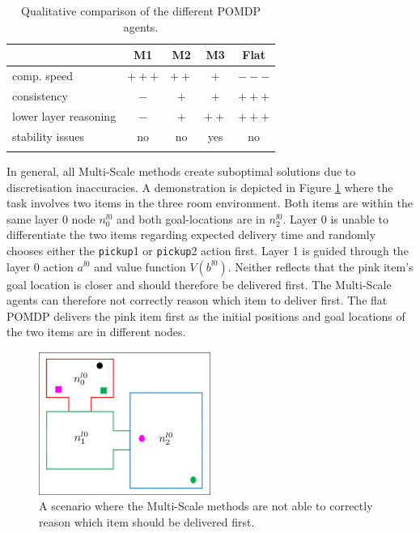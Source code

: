 \begin{table}[h]
    \centering
    \begin{tabular}{l c c c c}
    \toprule
         &  M1 & M2 & M3 & Flat\\
    \midrule
        \addlinespace
         comp. speed & $+++$ & $++$ & $+$ & $---$ \\
         \addlinespace
         consistency & $-$ & $+$ & $+$ & $+++$ \\
         \addlinespace
         lower layer reasoning & $-$ & $+$ & $++$ & $+++$ \\
         \addlinespace
         stability issues & no & no& yes & no\\
         \addlinespace
    \bottomrule
    \end{tabular}
    \caption{Qualitative comparison of the different POMDP agents.}
    \label{tab:properties}
\end{table}
In general, all Multi-Scale methods create suboptimal solutions due to discretisation inaccuracies. A demonstration is depicted in Figure \ref{fig:suboptimal} where the task involves two items in the three room environment. Both items are within the same layer 0 node $n_0^{l0}$ and both goal-locations are in $n_2^{l0}$. Layer 0 is unable to differentiate the two items regarding expected delivery time and randomly chooses either the \texttt{pickup}1 or \texttt{pickup}2 action first. Layer 1 is guided through the layer 0 action $a^{l0}$ and value function $V(b^{l0})$. Neither reflects that the pink item's goal location is closer and should therefore be delivered first. The Multi-Scale agents can therefore not correctly reason which item to deliver first. The flat POMDP delivers the pink item first as the initial positions and goal locations of the two items are in different nodes. 
\begin{figure}[h]
    \centering
    \includegraphics[width=0.5\textwidth]{Report/images/suboptimal.png}
    \caption{A scenario where the Multi-Scale methods are not able to correctly reason which item should be delivered first.}
    \label{fig:suboptimal}
\end{figure}
